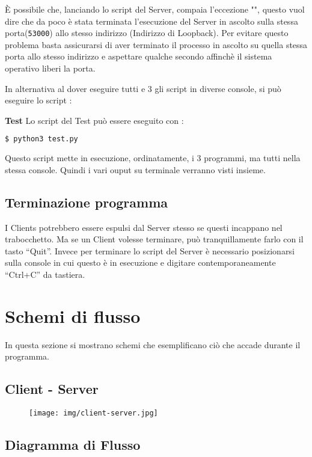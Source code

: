 \documentclass[a4paper,12pt]{report}
\begin{document}
È possibile che, lanciando lo script del Server, compaia l'eccezione "", questo vuol dire che da poco
è stata terminata l'esecuzione del Server in ascolto sulla stessa porta(\texttt{53000}) allo stesso indirizzo (Indirizzo di Loopback).
Per evitare questo problema basta assicurarsi di aver terminato il processo in ascolto su quella stessa
porta allo stesso indirizzo e aspettare qualche secondo affinchè il sistema operativo liberi la porta.

In alternativa al dover eseguire tutti e 3 gli script in diverse console, si può eseguire lo script :

\textbf{Test}
	\noindent Lo script del Test può essere eseguito con :
	\begin{lstlisting}[language=bash]
	  $ python3 test.py
	\end{lstlisting}	
Questo script mette in esecuzione, ordinatamente, i 3 programmi, ma tutti nella stessa console. Quindi i vari
ouput su terminale verranno visti insieme.

\subsection{Terminazione programma}
I Clients potrebbero essere espulsi dal Server stesso se questi incappano nel trabocchetto.
Ma se un Client volesse terminare, può tranquillamente farlo con il tasto ``Quit''.
Invece per terminare lo script del Server è necessario posizionarsi sulla console in cui questo
è in esecuzione e digitare contemporaneamente ``Ctrl+C'' da tastiera.

\section{Schemi di flusso}

In questa sezione si mostrano schemi che esemplificano ciò che accade durante il programma.

\subsection*{Client - Server}

\begin{figure}[H]
	\centering{}
	\texttt{[image: img/client-server.jpg]}
	\label{img:client-server}
\end{figure}

\subsection*{Diagramma di Flusso}
\end{document}
